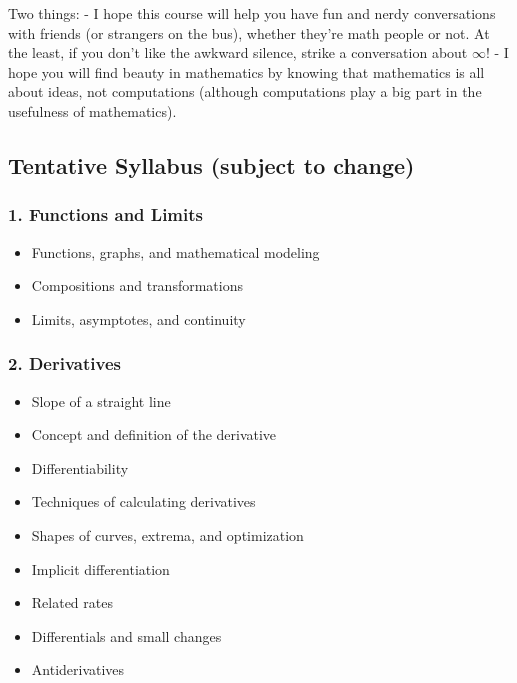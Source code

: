 \documentclass[
]{article}
\begin{document}
Two things:
- I hope this course will help you have fun and nerdy conversations with friends (or strangers on the bus), whether they're math people or not.
At the least, if you don't like the awkward silence, strike a conversation about \(\infty\)!
- I hope you will find beauty in mathematics by knowing that mathematics is all about ideas,
not computations (although computations play a big part in the usefulness of mathematics).

\hypertarget{tentative-syllabus-subject-to-change}{%
\subsection*{Tentative Syllabus (subject to change)}\label{tentative-syllabus-subject-to-change}}

\hypertarget{functions-and-limits}{%
\subsubsection*{1. Functions and Limits}\label{functions-and-limits}}

\begin{itemize}
\item
  Functions, graphs, and mathematical modeling
\item
  Compositions and transformations
\item
  Limits, asymptotes, and continuity
\end{itemize}

\hypertarget{derivatives}{%
\subsubsection*{2. Derivatives}\label{derivatives}}

\begin{itemize}
\item
  Slope of a straight line
\item
  Concept and definition of the derivative
\item
  Differentiability
\item
  Techniques of calculating derivatives
\item
  Shapes of curves, extrema, and optimization
\item
  Implicit differentiation
\item
  Related rates
\item
  Differentials and small changes
\item
  Antiderivatives
\end{itemize}
\end{document}
